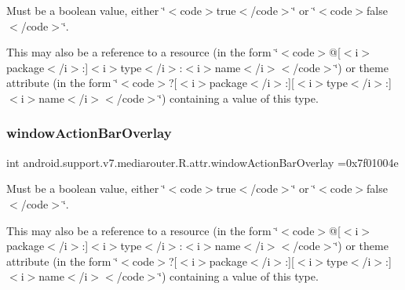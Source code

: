 Must be a boolean value, either \char`\"{}$<$code$>$true$<$/code$>$\char`\"{} or \char`\"{}$<$code$>$false$<$/code$>$\char`\"{}. 

This may also be a reference to a resource (in the form \char`\"{}$<$code$>$@\mbox{[}$<$i$>$package$<$/i$>$\+:\mbox{]}$<$i$>$type$<$/i$>$\+:$<$i$>$name$<$/i$>$$<$/code$>$\char`\"{}) or theme attribute (in the form \char`\"{}$<$code$>$?\mbox{[}$<$i$>$package$<$/i$>$\+:\mbox{]}\mbox{[}$<$i$>$type$<$/i$>$\+:\mbox{]}$<$i$>$name$<$/i$>$$<$/code$>$\char`\"{}) containing a value of this type. \mbox{\label{classandroid_1_1support_1_1v7_1_1mediarouter_1_1R_1_1attr_a3c1ca004f5390eccb164cfda9f9392f8}} 
\subsubsection{\texorpdfstring{window\+Action\+Bar\+Overlay}{windowActionBarOverlay}}
{\footnotesize\ttfamily int android.\+support.\+v7.\+mediarouter.\+R.\+attr.\+window\+Action\+Bar\+Overlay =0x7f01004e\hspace{0.3cm}{\ttfamily [static]}}

Must be a boolean value, either \char`\"{}$<$code$>$true$<$/code$>$\char`\"{} or \char`\"{}$<$code$>$false$<$/code$>$\char`\"{}. 

This may also be a reference to a resource (in the form \char`\"{}$<$code$>$@\mbox{[}$<$i$>$package$<$/i$>$\+:\mbox{]}$<$i$>$type$<$/i$>$\+:$<$i$>$name$<$/i$>$$<$/code$>$\char`\"{}) or theme attribute (in the form \char`\"{}$<$code$>$?\mbox{[}$<$i$>$package$<$/i$>$\+:\mbox{]}\mbox{[}$<$i$>$type$<$/i$>$\+:\mbox{]}$<$i$>$name$<$/i$>$$<$/code$>$\char`\"{}) containing a value of this type. \mbox{\label{classandroid_1_1support_1_1v7_1_1mediarouter_1_1R_1_1attr_ab789e70260e203465110433076413756}} 
